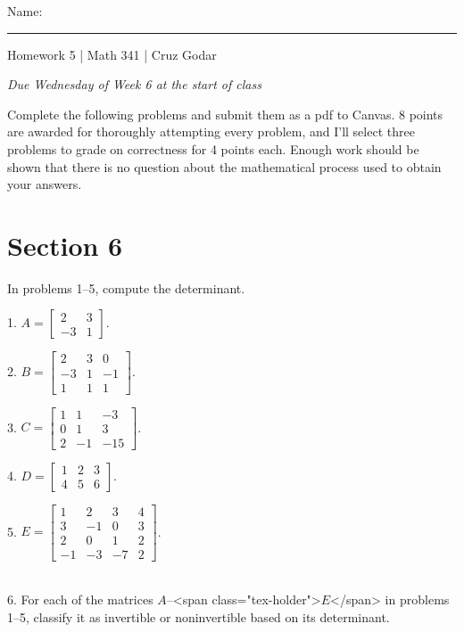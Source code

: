 \documentclass{article}
\begin{document}
\Large Name: \rule{2in}{0.15mm} \hfill Homework 5 | Math 341 | Cruz Godar \vspace{4pt} \normalsize

\textit{Due Wednesday of Week 6 at the start of class}

Complete the following problems and submit them as a pdf to Canvas. 8 points are awarded for thoroughly attempting every problem, and I'll select three problems to grade on correctness for 4 points each. Enough work should be shown that there is no question about the mathematical process used to obtain your answers.

\section{Section 6}

In problems 1--5, compute the determinant.

1. $\displaystyle A = \left[\begin{array}{cc} 2& 3 \\ -3& 1 \end{array}\right]$.

2. $\displaystyle B = \left[\begin{array}{ccc} 2& 3& 0 \\ -3& 1& -1 \\ 1& 1& 1 \end{array}\right]$.

3. $\displaystyle C = \left[\begin{array}{ccc} 1& 1& -3 \\ 0& 1& 3 \\ 2& -1& -15 \end{array}\right]$.

4. $\displaystyle D = \left[\begin{array}{ccc} 1& 2& 3 \\ 4& 5& 6 \end{array}\right]$.

5. $\displaystyle E = \left[\begin{array}{cccc} 1& 2& 3& 4 \\ 3& -1& 0& 3 \\ 2& 0& 1& 2\\ -1& -3& -7& 2 \end{array}\right]$.

~\\

6. For each of the matrices $A$--<span class="tex-holder">$E$</span> in problems 1--5, classify it as invertible or noninvertible based on its determinant.
\end{document}
